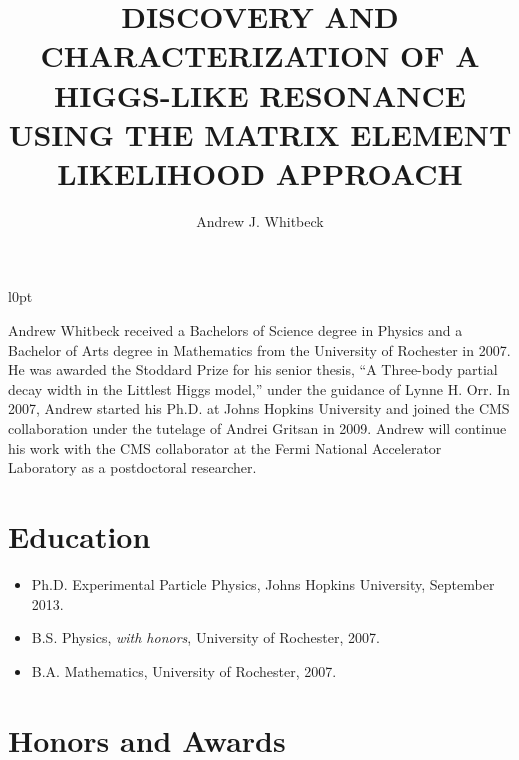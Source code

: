 \documentclass[12pt,oneside,final]{thesis}
\begin{document}
\title{DISCOVERY AND CHARACTERIZATION OF A HIGGS-LIKE RESONANCE
USING THE MATRIX ELEMENT LIKELIHOOD APPROACH}
\author{Andrew J. Whitbeck}
\dissertation
\doctorphilosophy
\copyrightnotice











%





\begin{vita}

\begin{wrapfigure}{l}{0pt}
\end{wrapfigure}

Andrew Whitbeck received a Bachelors of Science degree in
Physics and a Bachelor of Arts degree in Mathematics from
the University of Rochester in 2007.  He was awarded the
Stoddard Prize for his senior thesis, ``A Three-body partial
decay width in the Littlest Higgs model,'' under the guidance
of Lynne H. Orr.  In 2007, Andrew
started his Ph.D. at Johns Hopkins University and joined the
CMS collaboration under the tutelage of Andrei Gritsan in 2009.
Andrew will continue his work with the CMS collaborator at the
Fermi National Accelerator Laboratory as a postdoctoral
 researcher. 

\section*{Education}

\begin{itemize}
  \item Ph.D. Experimental Particle Physics, Johns Hopkins University, September 2013.
  \item B.S. Physics, \textit{with honors}, University of Rochester, 2007.
  \item B.A. Mathematics, University of Rochester, 2007.
\end{itemize}

\section*{Honors and Awards}


\end{vita}
\end{document}
